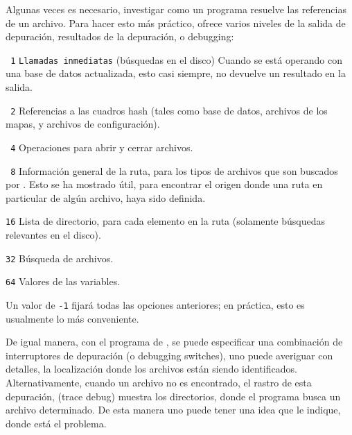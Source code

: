\documentclass{article}
\begin{document}
Algunas veces es necesario, investigar como un programa resuelve las
referencias de un archivo. Para hacer esto más práctico, \KPS{} ofrece
varios niveles de la salida de depuración, resultados de la
depuración, o debugging:

 \begin{ttdescription} 
                    \item[\texttt{\ 1}] \texttt{Llamadas inmediatas}
                        (búsquedas en el disco) Cuando se está
                        operando con una base de datos 
                        actualizada, esto casi siempre, no devuelve un
                        resultado en la salida.
                    \item[\texttt{\ 2}] Referencias a las cuadros hash
                        (tales como  base de datos,
                        archivos de los mapas, y archivos de
                        configuración).  
                    \item[\texttt{\ 4}] Operaciones para abrir y cerrar
                        archivos.  
                    \item[\texttt{\ 8}] Información general de la
                        ruta, para los tipos de archivos que son
                        buscados por \KPS{}. Esto se ha mostrado útil,
                        para encontrar el origen donde una ruta en
                        particular de algún archivo, haya sido
                        definida.  
                     \item[\texttt{16}] Lista de directorio, para cada
                         elemento en la ruta (solamente búsquedas
                         relevantes en el disco).  
                     \item[\texttt{32}] Búsqueda de archivos.  
                     \item[\texttt{64}] Valores de las variables.  
 \end{ttdescription}
 Un valor de \texttt{-1} fijará todas las opciones
 anteriores; en práctica, esto es usualmente lo más
 conveniente. 

 De igual manera, con el programa de , se
 puede especificar una combinación de interruptores de
 depuración (o debugging switches), uno puede averiguar con
 detalles, la localización donde los archivos están siendo
 identificados. Alternativamente, cuando un archivo no es
 encontrado, el rastro de esta depuración, (trace debug)
 muestra los directorios, donde el programa busca un archivo
 determinado. De esta manera uno puede tener una
 idea que le indique, donde está el problema.
\end{document}

